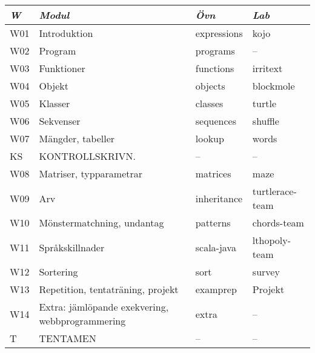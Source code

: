 \begin{tabular}{l|l|l|l}
\textit{W} & \textit{Modul} & \textit{Övn} & \textit{Lab} \\ \hline \hline
W01 & Introduktion & expressions & kojo \\
W02 & Program & programs & -- \\
W03 & Funktioner & functions & irritext \\
W04 & Objekt & objects & blockmole \\
W05 & Klasser & classes & turtle \\
W06 & Sekvenser & sequences & shuffle \\
W07 & Mängder, tabeller & lookup & words \\
KS & KONTROLLSKRIVN. & -- & -- \\
W08 & Matriser, typparametrar & matrices & maze \\
W09 & Arv & inheritance & turtlerace-team \\
W10 & Mönstermatchning, undantag & patterns & chords-team \\
W11 & Språkskillnader & scala-java & lthopoly-team \\
W12 & Sortering & sort & survey \\
W13 & Repetition, tentaträning, projekt & examprep & Projekt \\
W14 & Extra: jämlöpande exekvering, webbprogrammering & extra & -- \\
T & TENTAMEN & -- & -- \\
\end{tabular}
